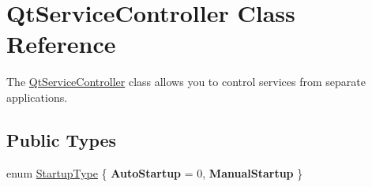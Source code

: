 \hypertarget{class_qt_service_controller}{}\section{Qt\+Service\+Controller Class Reference}
\label{class_qt_service_controller}


The \hyperlink{class_qt_service_controller}{Qt\+Service\+Controller} class allows you to control services from separate applications.  


\subsection*{Public Types}
\begin{DoxyCompactItemize}
\item 
enum \hyperlink{class_qt_service_controller_a946ac2b079d9760503da923c2eaf0aac}{Startup\+Type} \{ {\bfseries Auto\+Startup} = 0, 
{\bfseries Manual\+Startup}
 \}
\end{DoxyCompactItemize}
